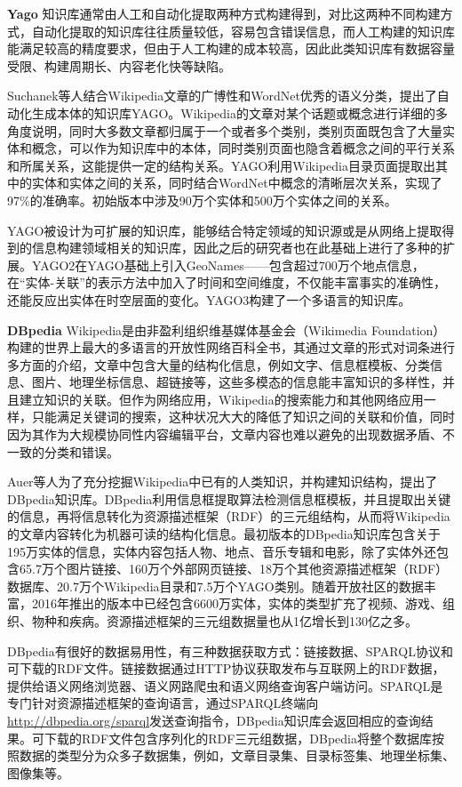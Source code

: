 \textbf{Yago}
知识库通常由人工和自动化提取两种方式构建得到，对比这两种不同构建方式，自动化提取的知识库往往质量较低，容易包含错误信息，而人工构建的知识库能满足较高的精度要求，但由于人工构建的成本较高，因此此类知识库有数据容量受限、构建周期长、内容老化快等缺陷。

Suchanek等人结合Wikipedia文章的广博性和WordNet优秀的语义分类，提出了自动化生成本体的知识库YAGO。Wikipedia的文章对某个话题或概念进行详细的多角度说明，同时大多数文章都归属于一个或者多个类别，类别页面既包含了大量实体和概念，可以作为知识库中的本体，同时类别页面也隐含着概念之间的平行关系和所属关系，这能提供一定的结构关系。YAGO利用Wikipedia目录页面提取出其中的实体和实体之间的关系，同时结合WordNet中概念的清晰层次关系，实现了97\%的准确率。初始版本中涉及90万个实体和500万个实体之间的关系。

YAGO被设计为可扩展的知识库，能够结合特定领域的知识源或是从网络上提取得到的信息构建领域相关的知识库，因此之后的研究者也在此基础上进行了多种的扩展。YAGO2在YAGO基础上引入GeoNames——包含超过700万个地点信息，在“实体-关联”的表示方法中加入了时间和空间维度，不仅能丰富事实的准确性，还能反应出实体在时空层面的变化。YAGO3构建了一个多语言的知识库。

\textbf{DBpedia}
Wikipedia是由非盈利组织维基媒体基金会（Wikimedia Foundation）构建的世界上最大的多语言的开放性网络百科全书，其通过文章的形式对词条进行多方面的介绍，文章中包含大量的结构化信息，例如文字、信息框模板、分类信息、图片、地理坐标信息、超链接等，这些多模态的信息能丰富知识的多样性，并且建立知识的关联。但作为网络应用，Wikipedia的搜索能力和其他网络应用一样，只能满足关键词的搜索，这种状况大大的降低了知识之间的关联和价值，同时因为其作为大规模协同性内容编辑平台，文章内容也难以避免的出现数据矛盾、不一致的分类和错误。

Auer等人为了充分挖掘Wikipedia中已有的人类知识，并构建知识结构，提出了DBpedia知识库。DBpedia利用信息框提取算法检测信息框模板，并且提取出关键的信息，再将信息转化为资源描述框架（RDF）的三元组结构，从而将Wikipedia的文章内容转化为机器可读的结构化信息。最初版本的DBpedia知识库包含关于195万实体的信息，实体内容包括人物、地点、音乐专辑和电影，除了实体外还包含65.7万个图片链接、160万个外部网页链接、18万个其他资源描述框架（RDF）数据库、20.7万个Wikipedia目录和7.5万个YAGO类别。随着开放社区的数据丰富，2016年推出的版本中已经包含6600万实体，实体的类型扩充了视频、游戏、组织、物种和疾病。资源描述框架的三元组数据量也从1亿增长到130亿之多。

DBpedia有很好的数据易用性，有三种数据获取方式：链接数据、SPARQL协议和可下载的RDF文件。链接数据通过HTTP协议获取发布与互联网上的RDF数据，提供给语义网络浏览器、语义网路爬虫和语义网络查询客户端访问。SPARQL是专门针对资源描述框架的查询语言，通过SPARQL终端向\url{http://dbpedia.org/sparql}发送查询指令，DBpedia知识库会返回相应的查询结果。可下载的RDF文件包含序列化的RDF三元组数据，DBpedia将整个数据库按照数据的类型分为众多子数据集，例如，文章目录集、目录标签集、地理坐标集、图像集等。

